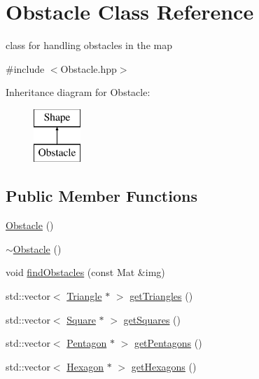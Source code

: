 \hypertarget{class_obstacle}{}\section{Obstacle Class Reference}
\label{class_obstacle}


class for handling obstacles in the map  




{\ttfamily \#include $<$Obstacle.\+hpp$>$}

Inheritance diagram for Obstacle\+:\begin{figure}[H]
\begin{center}
\leavevmode
\includegraphics[height=2.000000cm]{class_obstacle}
\end{center}
\end{figure}
\subsection*{Public Member Functions}
\begin{DoxyCompactItemize}
\item 
\mbox{\hyperlink{class_obstacle_a8f734072321fa06a7b7dae2d5f50f352}{Obstacle}} ()
\item 
\mbox{\hyperlink{class_obstacle_af2f9cc9c6cff75dca0974fd5ac4f71a9}{$\sim$\+Obstacle}} ()
\item 
void \mbox{\hyperlink{class_obstacle_ae333b23b742b38e50be13bc7aec2da5b}{find\+Obstacles}} (const Mat \&img)
\item 
std\+::vector$<$ \mbox{\hyperlink{class_triangle}{Triangle}} $\ast$ $>$ \mbox{\hyperlink{class_obstacle_ae4541d52e558b0995203e99d09d4d5d6}{get\+Triangles}} ()
\item 
std\+::vector$<$ \mbox{\hyperlink{class_square}{Square}} $\ast$ $>$ \mbox{\hyperlink{class_obstacle_aa7d4a88d87f53bc8ba1e2b9123354f3c}{get\+Squares}} ()
\item 
std\+::vector$<$ \mbox{\hyperlink{class_pentagon}{Pentagon}} $\ast$ $>$ \mbox{\hyperlink{class_obstacle_a7cbf1671e8fef324fe113517094f8428}{get\+Pentagons}} ()
\item 
std\+::vector$<$ \mbox{\hyperlink{class_hexagon}{Hexagon}} $\ast$ $>$ \mbox{\hyperlink{class_obstacle_a26db0857f78a85a975957720eeb0464d}{get\+Hexagons}} ()
\end{DoxyCompactItemize}


